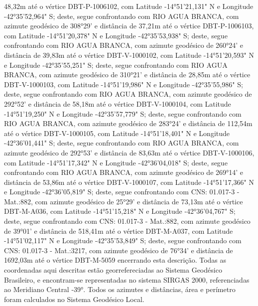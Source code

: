 48,32m  até o vértice DBT-P-1006102, com Latitude -14°51'21,131" N e Longitude -42°35'52,964" S; deste, segue confrontando com RIO AGUA BRANCA, com azimute geodésico de 308°29' e distância de 
37,21m  até o vértice DBT-P-1006103, com Latitude -14°51'20,378" N e Longitude -42°35'53,938" S; deste, segue confrontando com RIO AGUA BRANCA, com azimute geodésico de 260°24' e distância de 
39,83m  até o vértice DBT-V-1000102, com Latitude -14°51'20,593" N e Longitude -42°35'55,251" S; deste, segue confrontando com RIO AGUA BRANCA, com azimute geodésico de 310°21' e distância de 
28,85m  até o vértice DBT-V-1000103, com Latitude -14°51'19,986" N e Longitude -42°35'55,986" S; deste, segue confrontando com RIO AGUA BRANCA, com azimute geodésico de 292°52' e distância de 
58,18m  até o vértice DBT-V-1000104, com Latitude -14°51'19,250" N e Longitude -42°35'57,779" S; deste, segue confrontando com RIO AGUA BRANCA, com azimute geodésico de 283°24' e distância de 
112,54m  até o vértice DBT-V-1000105, com Latitude -14°51'18,401" N e Longitude -42°36'01,441" S; deste, segue confrontando com RIO AGUA BRANCA, com azimute geodésico de 292°53' e distância de 
83,63m  até o vértice DBT-V-1000106, com Latitude -14°51'17,342" N e Longitude -42°36'04,018" S; deste, segue confrontando com RIO AGUA BRANCA, com azimute geodésico de 269°14' e distância de 
53,86m  até o vértice DBT-V-1000107, com Latitude -14°51'17,366" N e Longitude -42°36'05,819" S; deste, segue confrontando com CNS: 01.017-3 - Mat.:882, com azimute geodésico de 25°29' e distância de 
73,13m  até o vértice DBT-M-A036, com Latitude -14°51'15,218" N e Longitude -42°36'04,767" S; deste, segue confrontando com CNS: 01.017-3 - Mat.:882, com azimute geodésico de 39°01' e distância de 
518,41m  até o vértice DBT-M-A037, com Latitude -14°51'02,117" N e Longitude -42°35'53,849" S; deste, segue confrontando com CNS: 01.017-3 - Mat.:3217, com azimute geodésico de 76°34' e distância de 
1692,03m  até o vértice DBT-M-5059 encerrando esta descrição. Todas as coordenadas aqui descritas estão georrefereciadas ao Sistema Geodésico Brasileiro, e encontram-se representadas no sistema SIRGAS 2000, referenciadas ao Meridiano Central -39°. Todos os azimutes e distâncias, área e perímetro foram calculados no Sistema Geodésico Local.